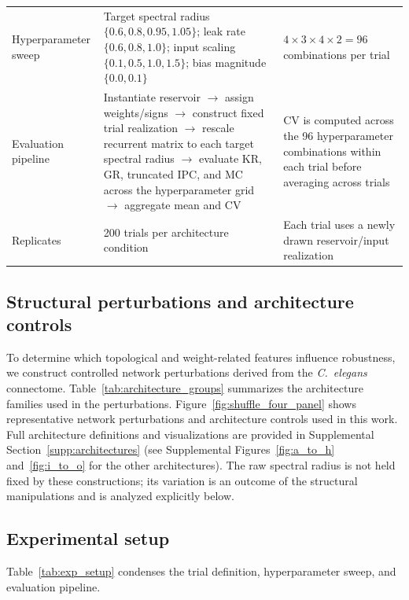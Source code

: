 \documentclass[a4paper,fleqn]{style_neural_networks/cas-dc}
\begin{document}
\begin{table}[!t]
\begin{tabular}{p{}p{}p{}}
        \addlinespace
        Hyperparameter sweep
        & Target spectral radius \(\{0.6,0.8,0.95,1.05\}\); leak rate \(\{0.6,0.8,1.0\}\); input scaling \(\{0.1,0.5,1.0,1.5\}\); bias magnitude \(\{0.0,0.1\}\)
        & \(4\times3\times4\times2=96\) combinations per trial \\
        
        \addlinespace
        Evaluation pipeline
        & Instantiate reservoir \(\rightarrow\) assign weights/signs \(\rightarrow\) construct fixed trial realization \(\rightarrow\) rescale recurrent matrix to each target spectral radius \(\rightarrow\) evaluate KR, GR, truncated IPC, and MC across the hyperparameter grid \(\rightarrow\) aggregate mean and CV
        & CV is computed across the 96 hyperparameter combinations within each trial before averaging across trials \\
        
        \addlinespace
        Replicates
        & 200 trials per architecture condition
        & Each trial uses a newly drawn reservoir/input realization \\
        
        \bottomrule
    \end{tabular}
\end{table}



\subsection{Structural perturbations and architecture controls}
To determine which topological and weight-related features influence robustness, we construct controlled network perturbations derived from the \emph{C.~elegans} connectome. Table~\ref{tab:architecture_groups} summarizes the architecture families used in the perturbations. Figure~\ref{fig:shuffle_four_panel} shows representative network perturbations and architecture controls used in this work. Full architecture definitions and visualizations are provided in Supplemental Section~\ref{supp:architectures} (see Supplemental Figures~\ref{fig:a_to_h} and~\ref{fig:i_to_o} for the other architectures).
The raw spectral radius is not held fixed by these constructions; its variation is an outcome of the structural manipulations and is analyzed explicitly below.


\subsection{Experimental setup}
\label{sec:trial_def}
Table~\ref{tab:exp_setup} condenses the trial definition, hyperparameter sweep, and evaluation pipeline.
\end{document}
